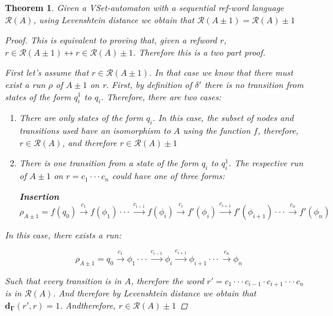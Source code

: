 \documentclass{article}
\newcommand{\lra}{\longrightarrow}
\newtheorem{theorem}{Theorem}
\begin{document}
\begin{theorem}
    Given a VSet-automaton with a sequential ref-word language $\mathcal{R}(A)$, using Levenshtein distance we obtain that $\mathcal{R}(A \pm 1) = \mathcal{R}(A) \pm 1$

    \begin{proof}
        This is equivalent to proving that, given a refword $r$, $r \in \mathcal{R}(A \pm 1) \leftrightarrow r \in \mathcal{R}(A)\pm 1$. Therefore this is a two part proof.

        First let's assume that $r \in \mathcal{R}(A \pm 1)$. In that case we know that there must exist a run $\rho$ of $A \pm 1$ on r. First, by definition of $\delta'$ there is no transition from states of the form $q_i^1$ to $q_i$. Therefore, there are two cases:
        \begin{enumerate}
            \item There are only states of the form $q_i$. In this case, the subset of nodes and transitions used have an isomorphism to $A$ using the function $f$, therefore, $r \in \mathcal{R}(A)$, and therefore $r \in \mathcal{R}(A) \pm 1$
            \item There is one transition from a state of the form $q_i$ to $q_i^1$. The respective run of $A \pm 1$ on $r = c_1 \cdot \cdot \cdot c_n$ could have one of three forms:

 \textbf{Insertion}
            \begin{equation}
                \rho_{A\pm 1} = f(q_0) \overset{c_1}{\lra} f(\phi_1) \cdot\cdot\cdot\overset{c_{i-1}}{\lra} f(\phi_i) \overset{c_{i}}{\lra} f'(\phi_i) \overset{c_{i+1}}{\lra} f'(\phi_{i + 1})  \cdot \cdot \cdot \overset{c_n}{\lra} f'(\phi_n)
            \end{equation}
        \end{enumerate}

    In this case, there exists a run:

        \begin{equation}
            \rho_{A\pm 1} = q_0 \overset{c_1}{\lra} \phi_1 \cdot\cdot\cdot \overset{c_{i-1}}{\lra}\phi_i  \overset{c_{i+1}}{\lra} \phi_{i + 1}  \cdot \cdot \cdot \overset{c_n}{\lra} \phi_n
        \end{equation}

        Such that every transition is in $A$, therefore the word $r'=c_1\cdot\cdot\cdot c_{i-1} \cdot c_{i+1} \cdot \cdot\cdot c_n$ is in $\mathcal{R}(A)$. And therefore by Levenshtein distance we obtain that $\mathbf{d_\Gamma}(r',r) = 1$. Andtherefore, $r \in \mathcal{R}(A) \pm 1$


\end{proof}
\end{theorem}
\end{document}
